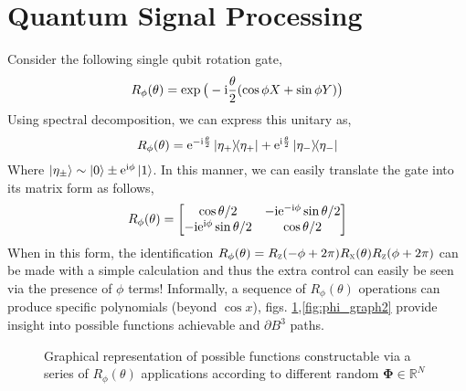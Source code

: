 \documentclass{article}
\begin{document}
\clearpage
\section{Quantum Signal Processing}
Consider the following single qubit rotation gate,
\begin{equation}
    R_\phi(\theta) = \exp\big(-\mathrm{i} \frac{\theta}{2}(\cos\phi X + \sin\phi Y)\big)
\end{equation}
Using spectral decomposition, we can express this unitary as,
\begin{equation}
    R_\phi(\theta) = \mathrm{e}^{-\mathrm{i}\frac{\theta}{2}}\ketbra{\eta_+} + \mathrm{e}^{\mathrm{i}\frac{\theta}{2}}\ketbra{\eta_-}
\end{equation}
Where $\ket{\eta_\pm} \sim \ket{0} \pm \mathrm{e}^{\mathrm{i} \phi}\ket{1}$. In this manner, we can easily translate the gate into its matrix form as follows,
\begin{equation}\label{eq:raw_ctrlrot}
    R_\phi(\theta) = \begin{bmatrix}
                        \cos\theta/2 & -\mathrm{i} \mathrm{e}^{-\mathrm{i}\phi}\sin\theta/2 \\
                        -\mathrm{i} \mathrm{e}^{\mathrm{i}\phi}\sin\theta/2 & \cos\theta/2
                     \end{bmatrix}
\end{equation}
When in this form, the identification $R_\phi(\theta) = R_{\textsc{z}}(-\phi + 2\pi)R_{\textsc{x}}(\theta) R_{\textsc{z}}(\phi + 2\pi)$ can be made with a simple calculation and thus the extra control can easily be seen via the presence of $\phi$ terms! Informally, a sequence of $R_\phi(\theta)$ operations can produce specific polynomials (beyond $\cos x$), figs. \ref{fig:phi_graph1},\ref{fig:phi_graph2} provide insight into possible functions achievable and $\partial B^3$ paths. 

\begin{figure}[h!]
    \centering
    \caption{Graphical representation of possible functions constructable via a series of $R_\phi(\theta)$ applications according to different random $\boldsymbol{\Phi}\in\mathbb{R}^N$}
    \label{fig:phi_graph1}
\end{figure}
\end{document}
